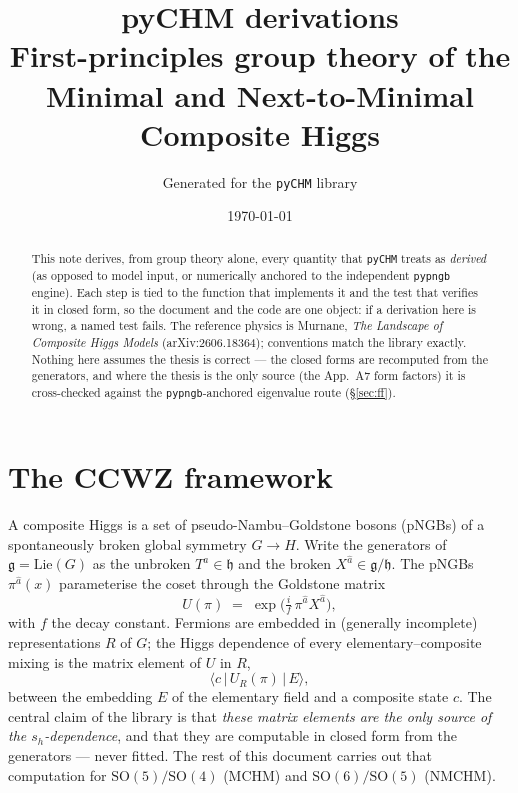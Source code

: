 \documentclass[11pt]{article}
\title{\textbf{pyCHM derivations}\\[4pt]
\large First-principles group theory of the Minimal and Next-to-Minimal Composite Higgs}
\author{Generated for the \texttt{pyCHM} library}
\date{\today}
\newcommand{\SO}[1]{\mathrm{SO}(#1)}
\newcommand{\sh}{s_h}
\newcommand{\code}[1]{\texttt{#1}}
\begin{document}
\maketitle

\begin{abstract}
This note derives, from group theory alone, every quantity that \code{pyCHM} treats as
\emph{derived} (as opposed to model input, or numerically anchored to the independent
\code{pypngb} engine). Each step is tied to the function that implements it and the test that
verifies it in closed form, so the document and the code are one object: if a derivation here is
wrong, a named test fails. The reference physics is Murnane, \emph{The Landscape of Composite
Higgs Models} (arXiv:2606.18364); conventions match the library exactly. Nothing here assumes the
thesis is correct --- the closed forms are recomputed from the generators, and where the thesis is
the only source (the App.~A7 form factors) it is cross-checked against the \code{pypngb}-anchored
eigenvalue route (\S\ref{sec:ff}).
\end{abstract}

\tableofcontents

\section{The CCWZ framework}
A composite Higgs is a set of pseudo-Nambu--Goldstone bosons (pNGBs) of a spontaneously broken
global symmetry $G\to H$. Write the generators of $\mathfrak{g}=\mathrm{Lie}(G)$ as the unbroken
$T^a\in\mathfrak{h}$ and the broken $X^{\hat a}\in\mathfrak{g}/\mathfrak{h}$. The pNGBs
$\pi^{\hat a}(x)$ parameterise the coset through the Goldstone matrix
\begin{equation}
  U(\pi) \;=\; \exp\!\Big(\tfrac{i}{f}\,\pi^{\hat a}X^{\hat a}\Big),
  \label{eq:U}
\end{equation}
with $f$ the decay constant. Fermions are embedded in (generally incomplete) representations $R$
of $G$; the Higgs dependence of every elementary--composite mixing is the matrix element of $U$
in $R$,
\begin{equation}
  \big\langle c \,\big|\, U_R(\pi) \,\big|\, E \big\rangle ,
  \label{eq:dressing}
\end{equation}
between the embedding $E$ of the elementary field and a composite state $c$. The central claim of
the library is that \emph{these matrix elements are the only source of the $\sh$-dependence}, and
that they are computable in closed form from the generators --- never fitted. The rest of this
document carries out that computation for $\SO5/\SO4$ (MCHM) and $\SO6/\SO5$ (NMCHM).
\end{document}
